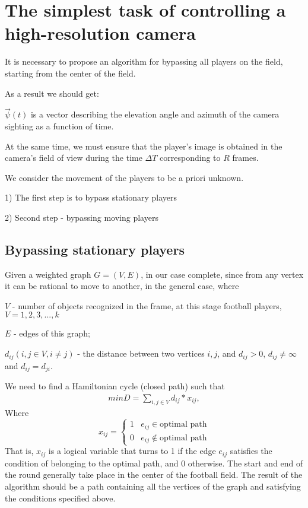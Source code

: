 \section{The simplest task of controlling a high-resolution camera}

It is necessary to propose an algorithm for bypassing all players on the field, starting from the center of the field.

As a result we should get:

$\vec \psi(t)$ is a vector describing the elevation angle and azimuth of the camera sighting as a function of time.

At the same time, we must ensure that the player’s image is obtained in the camera’s field of view during the time $\Delta T$ corresponding to $R$ frames.

We consider the movement of the players to be a priori unknown.

1) The first step is to bypass stationary players

2) Second step - bypassing moving players

\subsection{Bypassing stationary players}

Given a weighted graph $G = (V, E)$, in our case complete, since from any vertex it can be rational to move to another, in the general case, where

$V$ - number of objects recognized in the frame, at this stage football players, $V = {1, 2, 3, ..., k}$

$E$ - edges of this graph;

$d_{ij}(i, j \in V, i \neq j)$ - the distance between two vertices $i, j$, and $d_{ij} > 0$, $d_{ij} \neq \infty$ and $d_{ij} = d_{ji}$.

We need to find a Hamiltonian cycle (closed path) such that
\begin{align}
     minD = \sum_{i,j \in V} d_{ij} * x_{ij},
\end{align}
Where
\begin{equation}
     x_{ij} =
     \begin{cases}
         1 & e_{ij} \in \text{optimal path}\\
         0 & e_{ij} \notin \text{optimal path}
     \end{cases}
\end{equation}
That is, $x_{ij}$ is a logical variable that turns to 1 if the edge $e_{ij}$ satisfies the condition of belonging to the optimal path, and 0 otherwise. The start and end of the round generally take place in the center of the football field. The result of the algorithm should be a path containing all the vertices of the graph and satisfying the conditions specified above.


